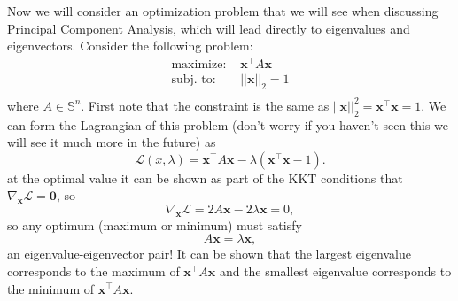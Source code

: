 \documentclass{article}
\newcommand{\1}{\mathbf{1}}
\newcommand{\0}{\mathbf{0}}
\newcommand{\xx}{\mathbf{x}}
\renewcommand{\SS}{\mathbb{S}}
\newcommand{\T}{\top}
\begin{document}
Now we will consider an optimization problem that we will see when
discussing Principal Component Analysis, which will lead directly
to eigenvalues and eigenvectors. Consider the following problem:
\begin{align*}
    \text{maximize: } & \xx^\T A\xx\\
    \text{subj. to: } & ||\xx||_2 = 1\\
\end{align*}
where $A\in\SS^n$.
First note that the constraint is the same as $||\xx||_2^2 = \xx^\T\xx = 1$.
We can form the Lagrangian of this problem (don't worry if you haven't seen this we
will see it much more in the future) as
\[
    \mathcal{L}(x,\lambda) = \xx^\T A\xx - \lambda (\xx^\T\xx - 1).
\]
at the optimal value it can be shown as part of the KKT conditions that
$\nabla_\xx \mathcal{L} = \0$, so
\[
    \nabla_\xx \mathcal{L} = 2A\xx - 2\lambda\xx = 0,
\]
so any optimum (maximum or minimum) must satisfy
\[
    A\xx = \lambda\xx,
\]
an eigenvalue-eigenvector pair! It can be shown that the largest eigenvalue
corresponds to the maximum of $\xx^\T A\xx$ and the smallest eigenvalue corresponds
to the minimum of $\xx^\T A\xx$.
\end{document}
